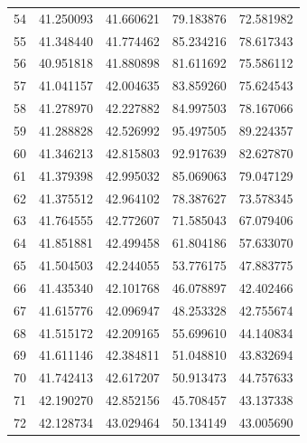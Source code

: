 \begin{table}
\begin{tabular}{rrrrr}
54 & 41.250093 & 41.660621 & 79.183876 & 72.581982 \\
55 & 41.348440 & 41.774462 & 85.234216 & 78.617343 \\
56 & 40.951818 & 41.880898 & 81.611692 & 75.586112 \\
57 & 41.041157 & 42.004635 & 83.859260 & 75.624543 \\
58 & 41.278970 & 42.227882 & 84.997503 & 78.167066 \\
59 & 41.288828 & 42.526992 & 95.497505 & 89.224357 \\
60 & 41.346213 & 42.815803 & 92.917639 & 82.627870 \\
61 & 41.379398 & 42.995032 & 85.069063 & 79.047129 \\
62 & 41.375512 & 42.964102 & 78.387627 & 73.578345 \\
63 & 41.764555 & 42.772607 & 71.585043 & 67.079406 \\
64 & 41.851881 & 42.499458 & 61.804186 & 57.633070 \\
65 & 41.504503 & 42.244055 & 53.776175 & 47.883775 \\
66 & 41.435340 & 42.101768 & 46.078897 & 42.402466 \\
67 & 41.615776 & 42.096947 & 48.253328 & 42.755674 \\
68 & 41.515172 & 42.209165 & 55.699610 & 44.140834 \\
69 & 41.611146 & 42.384811 & 51.048810 & 43.832694 \\
70 & 41.742413 & 42.617207 & 50.913473 & 44.757633 \\
71 & 42.190270 & 42.852156 & 45.708457 & 43.137338 \\
72 & 42.128734 & 43.029464 & 50.134149 & 43.005690 \\
\bottomrule
\end{tabular}
\end{table}
